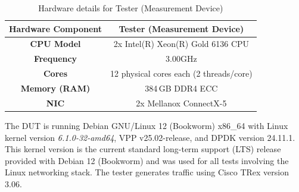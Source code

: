\begin{table}[h!]
\centering
\caption{Hardware details for Tester (Measurement Device)}
\begin{tabular}{|c|c|}
\hline
\textbf{Hardware Component} & \textbf{Tester (Measurement Device)} \\
\hline
\textbf{CPU Model} & 2x Intel(R) Xeon(R) Gold 6136 CPU \\
\hline
\textbf{Frequency} & 3.00GHz \\
\hline
\textbf{Cores} & 12 physical cores each (2 threads/core)\\
\hline
\textbf{Memory (RAM)} & 384 GB DDR4 ECC\\
\hline
\textbf{NIC} & 2x Mellanox ConnectX-5 \\
\hline
\end{tabular}
\label{tab:hardware_tester}
\end{table}

The DUT is running Debian GNU/Linux 12 (Bookworm) x86\_64 with Linux kernel version \textit{6.1.0-32-amd64}, VPP v25.02-release, and DPDK version 24.11.1. 
This kernel version is the current standard long-term support (LTS) release provided with Debian 12 (Bookworm) and was used for all tests involving the Linux networking stack.
The tester generates traffic using Cisco TRex version 3.06.
